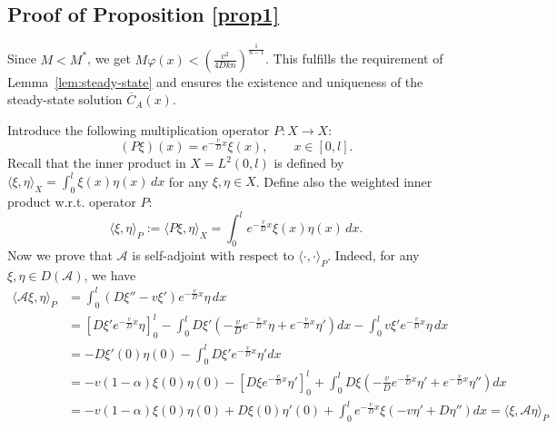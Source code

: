 \documentclass{mpi2015-cscpreprint}
\numberwithin{equation}{section}
\begin{document}
\subsection{Proof of Proposition \ref{prop1}}\label{sec:proof}

Since $M<M^*$, we get $M\varphi(x)<\left(\frac{v^2}{4Dkn}\right)^\frac{1}{n-1}$. This fulfills the requirement of Lemma~\ref{lem:steady-state} and ensures the existence and uniqueness of the steady-state solution $\overline{C}_A(x)$.

Introduce the following multiplication operator $P:X\to X$:
\begin{equation}\label{eq:operator_P}
(P\xi)(x) = e^{-\frac{v}{D}x}\xi(x),\qquad x\in[0,l].
\end{equation}
Recall that the inner product in $X=L^2(0,l)$ is defined by $\langle \xi,\eta\rangle_X=\int_0^l \xi(x)\eta(x)\,dx$ for any $\xi,\eta\in X$. Define also the weighted inner product w.r.t. operator $P$:
\begin{equation*}%
\langle \xi, \eta\rangle_P := \langle P\xi, \eta\rangle_{X} = \int_0^l e^{-\frac{v}{D}x}\xi(x)\eta(x)\,dx.
\end{equation*}
Now we prove that $\mathcal{A}$ is self-adjoint with respect to $\langle\cdot,\cdot\rangle_P$. Indeed, for any $\xi,\eta\in D(\mathcal{A})$, we have
\begin{equation*}
\begin{aligned}
\langle \mathcal{A}\xi,\eta\rangle_P &= \int_0^l (D\xi'' -v\xi' )e^{-\frac{v}{D}x}\eta \,dx
\\&=\left[D\xi'  e^{-\frac{v}{D}x}\eta \right]_0^l 
-\int_0^l D\xi' \left(-\frac{v}{D}e^{-\frac{v}{D}x}\eta  + e^{-\frac{v}{D}x}\eta' \right)dx 
-\int_0^l v\xi' e^{-\frac{v}{D}x}\eta \,dx
%
\\&=-D\xi'(0)\eta(0)-\int_0^l D\xi' e^{-\frac{v}{D}x}\eta' dx
\\&=-v(1-\alpha)\xi(0)\eta(0)
-\left[D\xi e^{-\frac{v}{D}x}\eta' \right]_0^l
+\int_0^l D\xi \left(-\frac{v}{D}e^{-\frac{v}{D}x}\eta'  + e^{-\frac{v}{D}x}\eta'' \right)dx
\\&=-v(1-\alpha)\xi(0)\eta(0)+D\xi(0)\eta'(0)
+\int_0^l e^{-\frac{v}{D}x}\xi \left(-v\eta'  +D\eta'' \right)dx
=\langle \xi,\mathcal{A}\eta\rangle_P
\end{aligned}
\end{equation*}
%
\end{document}
